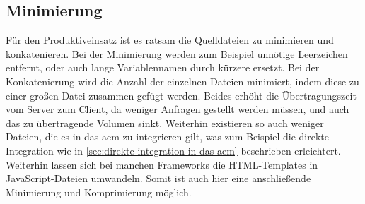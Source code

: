 \subsection{Minimierung}
Für den Produktiveinsatz ist es ratsam die Quelldateien zu minimieren und konkatenieren. Bei der Minimierung werden zum Beispiel unnötige Leerzeichen entfernt, oder auch lange Variablennamen durch kürzere ersetzt. Bei der Konkatenierung wird die Anzahl der einzelnen Dateien minimiert, indem diese zu einer großen Datei zusammen gefügt werden. Beides erhöht die Übertragungszeit vom Server zum Client, da weniger Anfragen gestellt werden müssen, und auch das zu übertragende Volumen sinkt. Weiterhin existieren so auch weniger Dateien, die es in das \ac{aem} zu integrieren gilt, was zum Beispiel die direkte Integration wie in \autoref{sec:direkte-integration-in-das-aem} beschrieben erleichtert. \\
Weiterhin lassen sich bei manchen Frameworks die HTML-Templates in JavaScript-Dateien umwandeln. Somit ist auch hier eine anschließende Minimierung und Komprimierung möglich.


